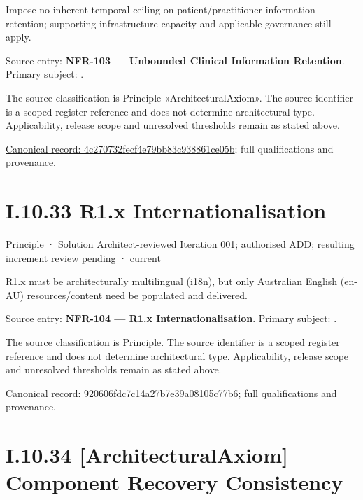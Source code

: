 Impose no inherent temporal ceiling on patient/practitioner information retention; supporting infrastructure capacity and applicable governance still apply.



Source entry: \textbf{NFR-103 — Unbounded Clinical Information Retention}. Primary subject: \texttt{}.



The source classification is Principle «ArchitecturalAxiom». The source identifier is a scoped register reference and does not determine architectural type. Applicability, release scope and unresolved thresholds remain as stated above.


{\footnotesize \href{../../../../../../../../continuum/motivation/principle/architectural-axiom/4c270732fecf4e79bb83c938861ce05b.md}{Canonical record: 4c270732fecf4e79bb83c938861ce05b}; full qualifications and provenance.}\par
\section*{I.10.33 R1.x Internationalisation}
\label{navigation:I.10.33}

\label{element:920606fdc7c14a27b7e39a08105c77b6}
{\small Principle · Solution Architect-reviewed Iteration 001; authorised ADD; resulting increment review pending · current}\par

R1.x must be architecturally multilingual (i18n), but only Australian English (en-AU) resources/content need be populated and delivered.



Source entry: \textbf{NFR-104 — R1.x Internationalisation}. Primary subject: \texttt{}.



The source classification is Principle. The source identifier is a scoped register reference and does not determine architectural type. Applicability, release scope and unresolved thresholds remain as stated above.


{\footnotesize \href{../../../../../../../../continuum/motivation/principle/920606fdc7c14a27b7e39a08105c77b6.md}{Canonical record: 920606fdc7c14a27b7e39a08105c77b6}; full qualifications and provenance.}\par
\section*{I.10.34 [ArchitecturalAxiom] Component Recovery Consistency}
\label{navigation:I.10.34}


